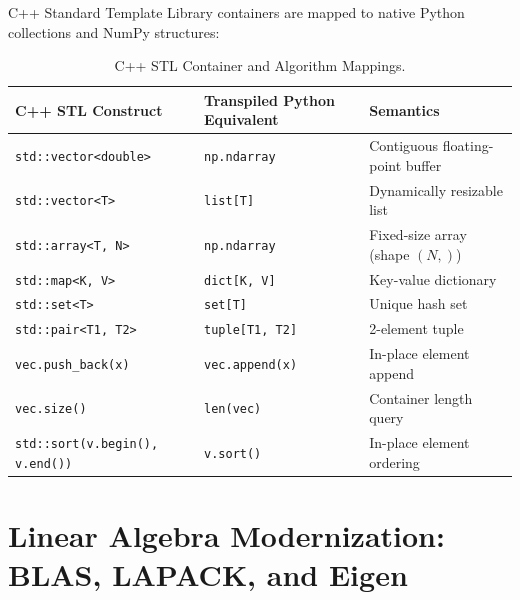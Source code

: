 \documentclass[11pt,a4paper]{article}
\theoremstyle{definition}
\begin{document}
C++ Standard Template Library containers are mapped to native Python collections and NumPy structures:
\begin{table}[h]
\centering
\small
\begin{tabular}{lll}
\toprule
\textbf{C++ STL Construct} & \textbf{Transpiled Python Equivalent} & \textbf{Semantics} \\
\midrule
\texttt{std::vector<double>} & \texttt{np.ndarray} & Contiguous floating-point buffer \\
\texttt{std::vector<T>} & \texttt{list[T]} & Dynamically resizable list \\
\texttt{std::array<T, N>} & \texttt{np.ndarray} & Fixed-size array (shape $(N,)$) \\
\texttt{std::map<K, V>} & \texttt{dict[K, V]} & Key-value dictionary \\
\texttt{std::set<T>} & \texttt{set[T]} & Unique hash set \\
\texttt{std::pair<T1, T2>} & \texttt{tuple[T1, T2]} & 2-element tuple \\
\texttt{vec.push\_back(x)} & \texttt{vec.append(x)} & In-place element append \\
\texttt{vec.size()} & \texttt{len(vec)} & Container length query \\
\texttt{std::sort(v.begin(), v.end())} & \texttt{v.sort()} & In-place element ordering \\
\bottomrule
\end{tabular}
\caption{C++ STL Container and Algorithm Mappings.}
\end{table}

\section{Linear Algebra Modernization: BLAS, LAPACK, and Eigen}
\end{document}
